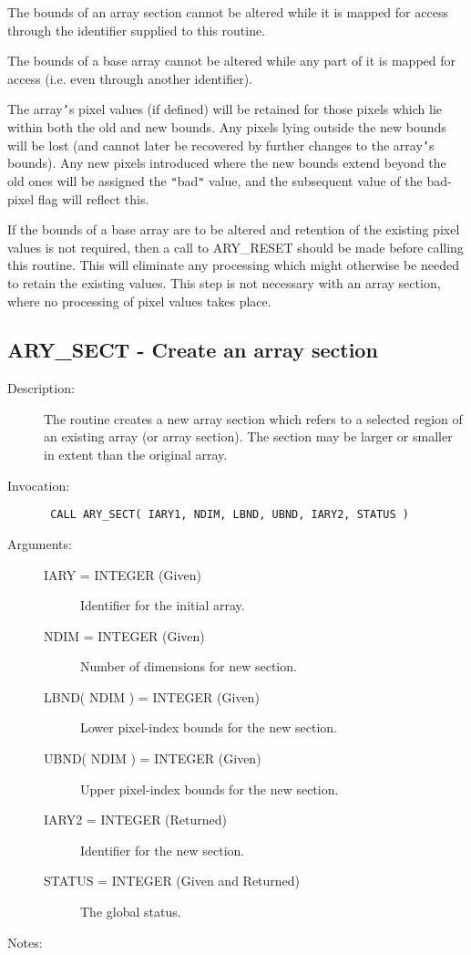\documentclass[twoside,11pt]{article}
\newcommand{\xlabel}[1]{}
\newlength{\sstbannerlength}
\newlength{\sstcaptionlength}
\newlength{\sstexampleslength}
\newlength{\sstexampleswidth}
\newcommand{\sstroutine}[3]{
   \goodbreak
   \rule{\textwidth}{0.5mm}
   \vspace{-7ex}
   \newline
   \settowidth{\sstbannerlength}{{\Large {\bf #1}}}
   \setlength{\sstcaptionlength}{\textwidth}
   \setlength{\sstexampleslength}{\textwidth}
   \addtolength{\sstbannerlength}{0.5em}
   \addtolength{\sstcaptionlength}{-2.0\sstbannerlength}
   \addtolength{\sstcaptionlength}{-5.0pt}
   \settowidth{\sstexampleswidth}{{\bf Examples:}}
   \addtolength{\sstexampleslength}{-\sstexampleswidth}
   \parbox[t]{\sstbannerlength}{\flushleft{\Large {\bf #1}}}
   \parbox[t]{\sstcaptionlength}{\center{\Large #2}}
   \parbox[t]{\sstbannerlength}{\flushright{\Large {\bf #1}}}
   \begin{description}
      #3
   \end{description}
}
\newcommand{\sstdescription}[1]{\item[Description:] #1}
\newcommand{\sstinvocation}[1]{\item[Invocation:]\hspace{0.4em}{\tt #1}}
\newcommand{\sstarguments}[1]{
   \item[Arguments:] \mbox{} \\
   \vspace{-3.5ex}
   \begin{description}
      #1
   \end{description}
}
\newcommand{\sstsubsection}[1]{ \item[{#1}] \mbox{} \\}
\newcommand{\sstnotes}[1]{\item[Notes:] \mbox{} \\[1.3ex] #1}
\newcommand{\sstitemlist}[1]{
  \mbox{} \\
  \vspace{-3.5ex}
  \begin{itemize}
     #1
  \end{itemize}
}
\newcommand{\sstitem}{\item}
\newcommand{\ssttt}{\tt}
\renewcommand{\sstroutine}[3]{
      \subsection{#1\xlabel{#1}-\label{#1}#2}
      \begin{description}
         #3
      \end{description}
   }
\renewcommand{\sstdescription}[1]{\item[Description:]
      \begin{description}
         #1
      \end{description}
   }
\renewcommand{\sstinvocation}[1]{\item[Invocation:]
      \begin{description}
         {\ssttt #1}
      \end{description}
   }
\renewcommand{\sstarguments}[1]{
      \item[Arguments:]
      \begin{description}
         #1
      \end{description}
   }
\renewcommand{\sstsubsection}[1]{\item[{#1}]}
\renewcommand{\sstnotes}[1]{\item[Notes:]
      \begin{description}
         #1
      \end{description}
   }
\newcommand{\sstitemlist}[1]{
      \begin{itemize}
         #1
      \end{itemize}
   }
\begin{document}
\begin{eqn*}
{{{         \sstitem
         The bounds of an array section cannot be altered while it is
         mapped for access through the identifier supplied to this
         routine.

         \sstitem
         The bounds of a base array cannot be altered while any part of
         it is mapped for access (i.e. even through another identifier).

         \sstitem
         The array{\tt '}s pixel values (if defined) will be retained for
         those pixels which lie within both the old and new bounds. Any
         pixels lying outside the new bounds will be lost (and cannot
         later be recovered by further changes to the array{\tt '}s bounds).
         Any new pixels introduced where the new bounds extend beyond the
         old ones will be assigned the {\tt "}bad{\tt "} value, and the subsequent
         value of the bad-pixel flag will reflect this.

         \sstitem
         If the bounds of a base array are to be altered and retention
         of the existing pixel values is not required, then a call to
         ARY\_RESET should be made before calling this routine. This will
         eliminate any processing which might otherwise be needed to
         retain the existing values. This step is not necessary with an
         array section, where no processing of pixel values takes place.
      }
   }
}
\sstroutine{
   ARY\_SECT
}{
   Create an array section
}{
   \sstdescription{
      The routine creates a new array section which refers to a
      selected region of an existing array (or array section). The
      section may be larger or smaller in extent than the original
      array.
   }
   \sstinvocation{
      CALL ARY\_SECT( IARY1, NDIM, LBND, UBND, IARY2, STATUS )
   }
   \sstarguments{
      \sstsubsection{
         IARY = INTEGER (Given)
      }{
         Identifier for the initial array.
      }
      \sstsubsection{
         NDIM = INTEGER (Given)
      }{
         Number of dimensions for new section.
      }
      \sstsubsection{
         LBND( NDIM ) = INTEGER (Given)
      }{
         Lower pixel-index bounds for the new section.
      }
      \sstsubsection{
         UBND( NDIM ) = INTEGER (Given)
      }{
         Upper pixel-index bounds for the new section.
      }
      \sstsubsection{
         IARY2 = INTEGER (Returned)
      }{
         Identifier for the new section.
      }
      \sstsubsection{
         STATUS = INTEGER (Given and Returned)
      }{
         The global status.
      }
   }
   \sstnotes{
      \sstitemlist{

}}}
\end{eqn*}
\end{document}
